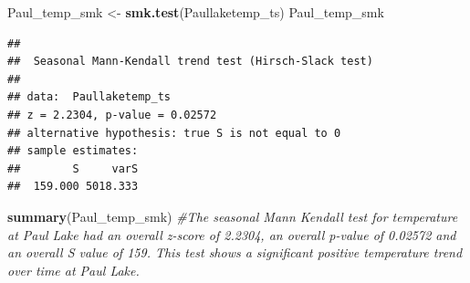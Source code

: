 \documentclass[12pt,]{article}
\newenvironment{Shaded}{\begin{snugshade}}{\end{snugshade}}
\newcommand{\KeywordTok}[1]{\textcolor[rgb]{0.13,0.29,0.53}{\textbf{#1}}}
\newcommand{\StringTok}[1]{\textcolor[rgb]{0.31,0.60,0.02}{#1}}
\newcommand{\CommentTok}[1]{\textcolor[rgb]{0.56,0.35,0.01}{\textit{#1}}}
\newcommand{\NormalTok}[1]{#1}
\begin{document}
\begin{Shaded}
\begin{Highlighting}[]
\NormalTok{Paul_temp_smk <-}\StringTok{ }\KeywordTok{smk.test}\NormalTok{(Paullaketemp_ts)}
\NormalTok{Paul_temp_smk}
\end{Highlighting}
\end{Shaded}

\begin{verbatim}
## 
##  Seasonal Mann-Kendall trend test (Hirsch-Slack test)
## 
## data:  Paullaketemp_ts
## z = 2.2304, p-value = 0.02572
## alternative hypothesis: true S is not equal to 0
## sample estimates:
##        S     varS 
##  159.000 5018.333
\end{verbatim}

\begin{Shaded}
\begin{Highlighting}[]
\KeywordTok{summary}\NormalTok{(Paul_temp_smk) }\CommentTok{#The seasonal Mann Kendall test for temperature at Paul Lake had an overall z-score of 2.2304, an overall p-value of 0.02572 and an overall S value of 159. This test shows a significant positive temperature trend over time at Paul Lake.}
\end{Highlighting}
\end{Shaded}
\end{document}
